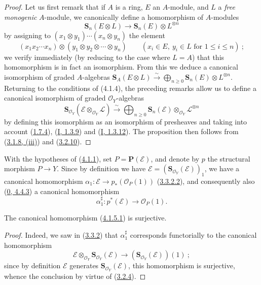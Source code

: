 \begin{proof}
Let us first remark that if $A$ is a ring, $E$ an $A$-module, and $L$ a
\emph{free monogenic} $A$-module, we canonically define a homomorphism
of $A$-modules
\[
  \mathbf{S}_n(E\otimes L)\longrightarrow
  \mathbf{S}_n(E)\otimes L^{\otimes n}
\]
by assigning to
$(x_1\otimes y_1)\cdots(x_n\otimes y_n)$ the element
\[
  (x_1x_2\cdots x_n)\otimes(y_1\otimes y_2\otimes\cdots\otimes y_n)
  \qquad(x_i\in E,\ y_i\in L\text{ for }1\leq i\leq n)~;
\]
we verify immediately (by reducing to the case where $L=A$) that this
homomorphism is in fact an isomorphism. From this we deduce a canonical
isomorphism of graded $A$-algebras
$\mathbf{S}_A(E\otimes L)\xrightarrow{\sim}
\bigoplus_{n\geq0}\mathbf{S}_n(E)\otimes L^{\otimes n}$. Returning to the
conditions of (4.1.4), the preceding remarks allow us to define a
canonical isomorphism of graded $\mathcal{O}_Y$-algebras
\[
\label{II.4.1.4.1}
  \mathbf{S}_{\mathcal{O}_Y}(\mathcal{E}\otimes_{\mathcal{O}_Y}\mathcal{L})
  \xrightarrow{\sim}
  \bigoplus_{n\geq0}\mathbf{S}_n(\mathcal{E})
  \otimes_{\mathcal{O}_Y}\mathcal{L}^{\otimes n}
\tag{4.1.4.1}
\]
by defining this isomorphism as an isomorphism of presheaves and
taking into account (\hyperref[II.1.7.4]{1.7.4}),
(\hyperref[I.1.3.9]{I, 1.3.9}) and
(\hyperref[I.1.3.12]{I, 1.3.12}). The proposition then follows from
(\hyperref[II.3.1.8]{3.1.8, (iii)}) and
(\hyperref[II.3.2.10]{3.2.10}).
\end{proof}

\begin{env}[4.1.5]
\label{II.4.1.5}
With the hypotheses of (\hyperref[II.4.1.1]{4.1.1}), set
$P=\mathbf{P}(\mathcal{E})$, and denote by $p$ the structural morphism
$P\to Y$. Since by definition we have
$\mathcal{E}=(\mathbf{S}_{\mathcal{O}_Y}(\mathcal{E}))_1$, we have a
canonical homomorphism
$\alpha_1:\mathcal{E}\to p_*(\mathcal{O}_P(1))$
(\hyperref[II.3.3.2.2]{3.3.2.2}), and consequently also
(\hyperref[0.4.4.3]{0, 4.4.3}) a canonical homomorphism
\[
\label{II.4.1.5.1}
  \alpha_1^\sharp:p^*(\mathcal{E})\longrightarrow\mathcal{O}_P(1).
\tag{4.1.5.1}
\]
\end{env}

\begin{proposition}[4.1.6]
\label{II.4.1.6}
The canonical homomorphism (\hyperref[II.4.1.5.1]{4.1.5.1}) is surjective.
\end{proposition}

\begin{proof}
Indeed, we saw in (\hyperref[II.3.3.2]{3.3.2}) that
$\alpha_1^\sharp$ corresponds functorially to the canonical homomorphism
\[
  \mathcal{E}\otimes_{\mathcal{O}_Y}
  \mathbf{S}_{\mathcal{O}_Y}(\mathcal{E})
  \longrightarrow
  (\mathbf{S}_{\mathcal{O}_Y}(\mathcal{E}))(1)~;
\]
since by definition $\mathcal{E}$ generates
$\mathbf{S}_{\mathcal{O}_Y}(\mathcal{E})$, this homomorphism is surjective,
whence the conclusion by virtue of (\hyperref[II.3.2.4]{3.2.4}).
\end{proof}


